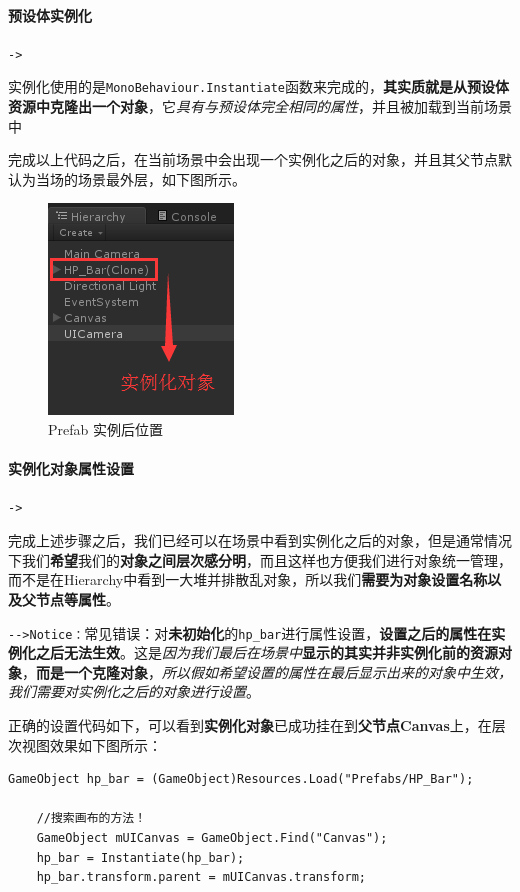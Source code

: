 \documentclass[UTF8,a4paper,12pt]{ctexbook}
\begin{document}
			\paragraph{预设体实例化}\verb|->|
			
				实例化使用的是\verb|MonoBehaviour.Instantiate|函数来完成的，\textbf{其实质就是从预设体资源中克隆出一个对象}，它\textit{具有与预设体完全相同的属性}，并且被加载到当前场景中
				
				完成以上代码之后，在当前场景中会出现一个实例化之后的对象，并且其父节点默认为当场的场景最外层，如下图所示。
					\begin{figure}[H]
						\centering
						\includegraphics[scale=0.8]{Prefab-2.png}
						\caption{Prefab 实例后位置}
					\end{figure}
				
			\paragraph{实例化对象属性设置}\verb|->|
				
				完成上述步骤之后，我们已经可以在场景中看到实例化之后的对象，但是通常情况下我们\textbf{希望}我们的\textbf{对象之间层次感分明}，而且这样也方便我们进行对象统一管理，而不是在Hierarchy中看到一大堆并排散乱对象，所以我们\textbf{需要为对象设置名称以及父节点等属性}。
			
				\verb|-->Notice：|常见错误：对\textbf{未初始化}的\verb|hp_bar|进行属性设置，\textbf{设置之后的属性在实例化之后无法生效}。这是\textit{因为我们最后在场景中}\textbf{显示的其实并非实例化前的资源对象}，\textbf{而是一个克隆对象}，\color{blue}\textit{所以假如希望设置的属性在最后显示出来的对象中生效，我们需要对实例化之后的对象进行设置}。\color{black}
			
			  正确的设置代码如下，可以看到\textbf{实例化对象}已成功挂在到\textbf{父节点Canvas}上，在层次视图效果如下图所示：
			  	\begin{lstlisting}[xleftmargin = .079\textwidth, frame = L]
	GameObject hp_bar = (GameObject)Resources.Load("Prefabs/HP_Bar");
	
	//搜索画布的方法！
	GameObject mUICanvas = GameObject.Find("Canvas");
	hp_bar = Instantiate(hp_bar);
	hp_bar.transform.parent = mUICanvas.transform;
			  	\end{lstlisting}
			  	
\end{document}
